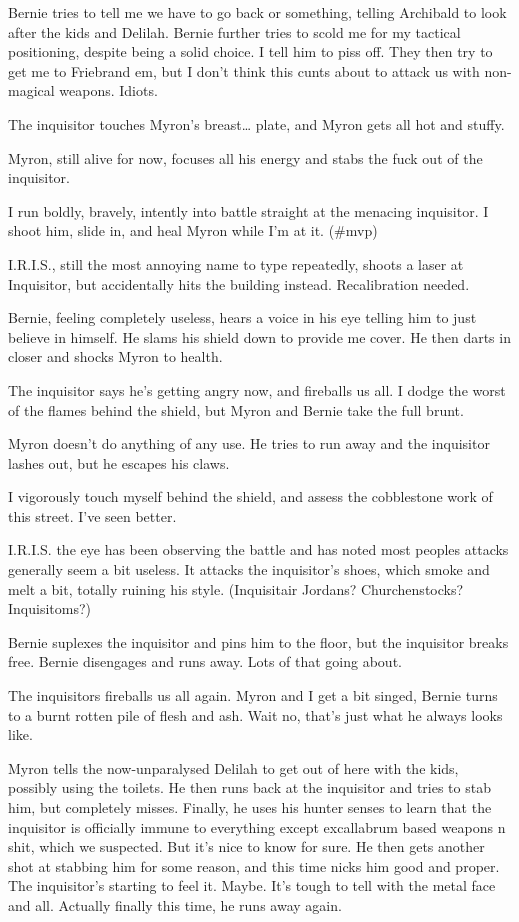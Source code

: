 Bernie tries to tell me we have to go back or something, telling Archibald to look after the kids and Delilah. Bernie further tries to scold me for my tactical positioning, despite being a solid choice. I tell him to piss off. They then try to get me to Friebrand em, but I don’t think this cunts about to attack us with non-magical weapons. Idiots.\medskip

The inquisitor touches Myron’s breast… plate, and Myron gets all hot and stuffy.\medskip

Myron, still alive for now, focuses all his energy and stabs the fuck out of the inquisitor.\medskip

I run boldly, bravely, intently into battle straight at the menacing inquisitor. I shoot him, slide in, and heal Myron while I’m at it. (\#mvp)\medskip

I.R.I.S., still the most annoying name to type repeatedly, shoots a laser at Inquisitor, but accidentally hits the building instead. Recalibration needed.\medskip

Bernie, feeling completely useless, hears a voice in his eye telling him to just believe in himself. He slams his shield down to provide me cover. He then darts in closer and shocks Myron to health.\medskip

The inquisitor says he’s getting angry now, and fireballs us all. I dodge the worst of the flames behind the shield, but Myron and Bernie take the full brunt.\medskip

Myron doesn’t do anything of any use. He tries to run away and the inquisitor lashes out, but he escapes his claws.\medskip

I vigorously touch myself behind the shield, and assess the cobblestone work of this street. I’ve seen better.\medskip

I.R.I.S. the eye has been observing the battle and has noted most peoples attacks generally seem a bit useless. It attacks the inquisitor’s shoes, which smoke and melt a bit, totally ruining his style. (Inquisitair Jordans? Churchenstocks? Inquisitoms?)\medskip

Bernie suplexes the inquisitor and pins him to the floor, but the inquisitor breaks free. Bernie disengages and runs away. Lots of that going about.\medskip

The inquisitors fireballs us all again. Myron and I get a bit singed, Bernie turns to a burnt rotten pile of flesh and ash. Wait no, that’s just what he always looks like.\medskip

Myron tells the now-unparalysed Delilah to get out of here with the kids, possibly using the toilets. He then runs back at the inquisitor and tries to stab him, but completely misses. Finally, he uses his hunter senses to learn that the inquisitor is officially immune to everything except excallabrum based weapons n shit, which we suspected. But it’s nice to know for sure. He then gets another shot at stabbing him for some reason, and this time nicks him good and proper. The inquisitor’s starting to feel it. Maybe. It’s tough to tell with the metal face and all. Actually finally this time, he runs away again.\medskip

